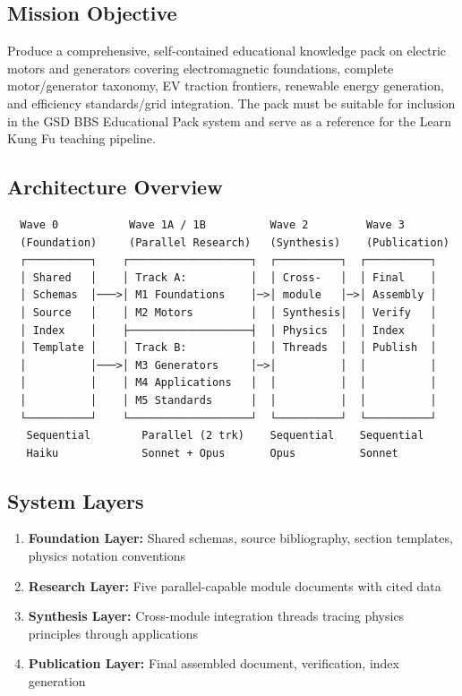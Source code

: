 \documentclass[11pt,letterpaper]{article}
\begin{document}
\subsection{Mission Objective}

Produce a comprehensive, self-contained educational knowledge pack on electric motors and generators covering electromagnetic foundations, complete motor/generator taxonomy, EV traction frontiers, renewable energy generation, and efficiency standards/grid integration. The pack must be suitable for inclusion in the GSD BBS Educational Pack system and serve as a reference for the Learn Kung Fu teaching pipeline.

\subsection{Architecture Overview}

\begin{asciibox}
\begin{verbatim}
  Wave 0           Wave 1A / 1B          Wave 2         Wave 3
  (Foundation)     (Parallel Research)   (Synthesis)    (Publication)
  ┌──────────┐    ┌───────────────────┐  ┌──────────┐  ┌──────────┐
  │ Shared   │    │ Track A:          │  │ Cross-   │  │ Final    │
  │ Schemas  │───>│ M1 Foundations    │─>│ module   │─>│ Assembly │
  │ Source   │    │ M2 Motors         │  │ Synthesis│  │ Verify   │
  │ Index    │    ├───────────────────┤  │ Physics  │  │ Index    │
  │ Template │    │ Track B:          │  │ Threads  │  │ Publish  │
  │          │───>│ M3 Generators     │─>│          │  │          │
  │          │    │ M4 Applications   │  │          │  │          │
  │          │    │ M5 Standards      │  │          │  │          │
  └──────────┘    └───────────────────┘  └──────────┘  └──────────┘
   Sequential        Parallel (2 trk)    Sequential    Sequential
   Haiku             Sonnet + Opus       Opus          Sonnet
\end{verbatim}
\end{asciibox}

\subsection{System Layers}

\begin{enumerate}[leftmargin=2em]
\item \textbf{Foundation Layer:} Shared schemas, source bibliography, section templates, physics notation conventions
\item \textbf{Research Layer:} Five parallel-capable module documents with cited data
\item \textbf{Synthesis Layer:} Cross-module integration threads tracing physics principles through applications
\item \textbf{Publication Layer:} Final assembled document, verification, index generation
\end{enumerate}
\end{document}
